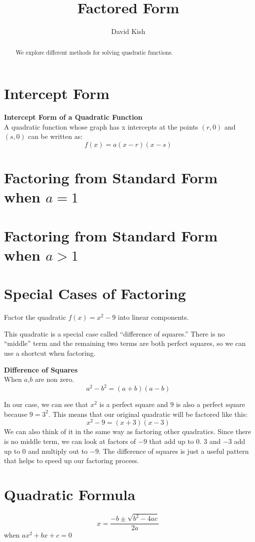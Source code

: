 \documentclass{ximera}
\author{David Kish}
\title{Factored Form}
\begin{document}
\begin{abstract}
We explore different methods for solving quadratic functions.
\end{abstract}
\maketitle
\section{Intercept Form}
\begin{callout} \textbf{\large{Intercept Form of a Quadratic Function}}\\
          A quadratic function whose graph has x intercepts at the points $(r,0)$ and $(s,0)$ can be written as:\\
\[
f(x)=a(x-r)(x-s)
\]
\end{callout}

\begin{example}
\begin{explanation}

\end{explanation}
\end{example}
\section{Factoring from Standard Form when $a=1$}
\section{Factoring from Standard Form when $a>1$}
\section{Special Cases of Factoring}
\begin{example}
Factor the quadratic $f(x)=x^2-9$ into linear components.
\begin{explanation}
This quadratic is a special case called ``difference of squares.'' There is no ``middle'' term and the remaining two terms are both perfect squares, so we can use a shortcut when factoring.
\begin{callout}
\textbf{Difference of Squares}\\
When $a$,$b$ are non zero.
\[
a^2-b^2=(a+b)(a-b)
\]
\end{callout}
In our case, we can see that $x^2$ is a perfect square and $9$ is also a perfect square because $9=3^2$. This means that our original quadratic will be factored like this:
\[
x^2-9=(x+3)(x-3)
\]
We can also think of it in the same way as factoring other quadratics. Since there is no middle term, we can look at factors of $-9$ that add up to $0$. $3$ and $-3$ add up to $0$ and multiply out to $-9$. The difference of squares is just a useful pattern that helps to speed up our factoring process.
\end{explanation}
\end{example}
\section{Quadratic Formula}
\begin{callout}
\[
x=\frac{-b\pm \sqrt{b^2-4ac}}{2a}
\]
when $ax^2+bx+c =0$
\end{callout}

 
\end{document}

